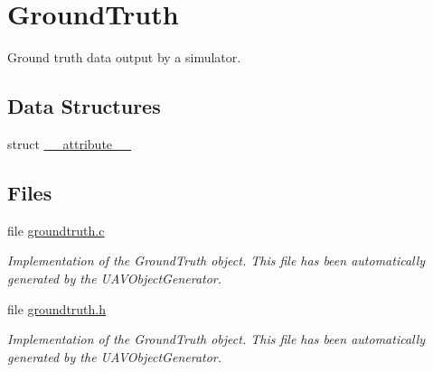 \hypertarget{group___ground_truth}{\section{\-Ground\-Truth}
\label{group___ground_truth}
}


\-Ground truth data output by a simulator.  


\subsection*{\-Data \-Structures}
\begin{DoxyCompactItemize}
\item 
struct \hyperlink{struct____attribute____}{\-\_\-\-\_\-attribute\-\_\-\-\_\-}
\end{DoxyCompactItemize}
\subsection*{\-Files}
\begin{DoxyCompactItemize}
\item 
file \hyperlink{groundtruth_8c}{groundtruth.\-c}
\begin{DoxyCompactList}\small\item\em \-Implementation of the \-Ground\-Truth object. \-This file has been automatically generated by the \-U\-A\-V\-Object\-Generator. \end{DoxyCompactList}\item 
file \hyperlink{groundtruth_8h}{groundtruth.\-h}
\begin{DoxyCompactList}\small\item\em \-Implementation of the \-Ground\-Truth object. \-This file has been automatically generated by the \-U\-A\-V\-Object\-Generator. \end{DoxyCompactList}\end{DoxyCompactItemize}
